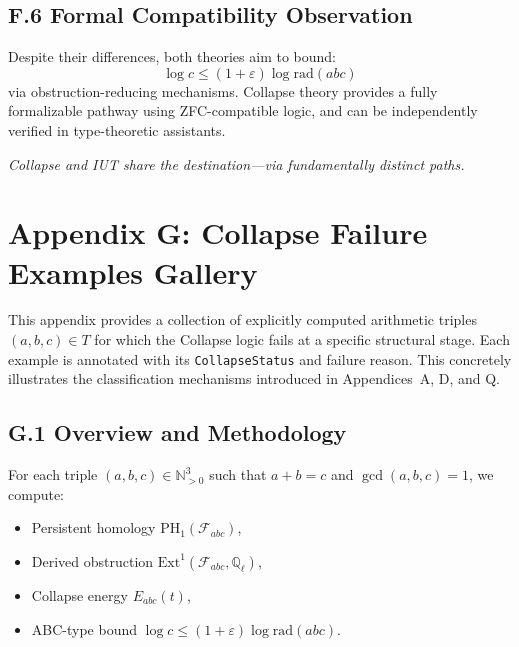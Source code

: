 \documentclass[11pt]{article}
\begin{document}
\subsection*{F.6 Formal Compatibility Observation}

Despite their differences, both theories aim to bound:
\[
\log c \leq (1 + \varepsilon) \log \mathrm{rad}(abc)
\]
via obstruction-reducing mechanisms. Collapse theory provides a fully formalizable pathway  
using ZFC-compatible logic, and can be independently verified in type-theoretic assistants.

\begin{center}
\textit{Collapse and IUT share the destination—via fundamentally distinct paths.}
\end{center}



\section*{Appendix G: Collapse Failure Examples Gallery}

This appendix provides a collection of explicitly computed arithmetic triples \( (a,b,c) \in T \)  
for which the Collapse logic fails at a specific structural stage. Each example is annotated with its  
\texttt{CollapseStatus} and failure reason. This concretely illustrates the classification mechanisms  
introduced in Appendices~A, D, and Q.

\subsection*{G.1 Overview and Methodology}

For each triple \( (a,b,c) \in \mathbb{N}_{>0}^3 \) such that \( a + b = c \) and \( \gcd(a,b,c)=1 \),  
we compute:

\begin{itemize}
  \item Persistent homology \( \mathrm{PH}_1(\mathcal{F}_{abc}) \),
  \item Derived obstruction \( \mathrm{Ext}^1(\mathcal{F}_{abc}, \mathbb{Q}_\ell) \),
  \item Collapse energy \( E_{abc}(t) \),
  \item ABC-type bound \( \log c \leq (1+\varepsilon)\log \mathrm{rad}(abc) \).
\end{itemize}
\end{document}
